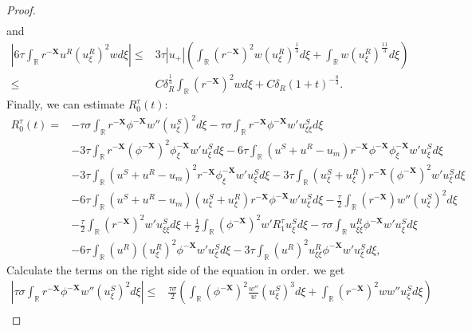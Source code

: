 \documentclass[10pt,reqno]{amsart}
\numberwithin{equation}{section}
\begin{document}
\begin{proof}
\begin{equation}
\begin{aligned}
			\end{aligned}
		\end{equation}
		and
		\begin{equation}\label{N14}
			\begin{aligned}
				\left|6\tau\int_{\mathbb{R}}r^{-\mathbf{X}}u^R(u_{\xi}^R)^2wd\xi\right|\leq&3\tau|u_+|\left(\int_{\mathbb{R}}(r^{-\mathbf{X}})^2w(u_{\xi}^R)^{\frac{1}{3}}d\xi+\int_{\mathbb{R}}w(u_{\xi}^R)^{\frac{11}{3}}d\xi\right)\\
				\leq&C\delta_R^{\frac{1}{3}}\int_{\mathbb{R}}(r^{-\mathbf{X}})^2wd\xi+C\delta_R(1+t)^{-\frac{8}{3}}.
			\end{aligned}
		\end{equation}
		Finally, we can estimate $R_0^{\tau}(t)$:
		\begin{equation*}
			\begin{aligned}
				R_{0}^{\tau}(t)=&- \tau\sigma\int_{\mathbb{R}}r^{-\mathbf{X}}\phi^{-\mathbf{X}}w''\left(u_{\xi}^{S}\right)^{2}d\xi-\tau\sigma\int_{\mathbb{R}}r^{-\mathbf{X}}\phi^{-\mathbf{X}}w'u^S_{\xi\xi}d\xi\\
				&-3\tau\int_{\mathbb{R}}r^{-\mathbf{X}}(\phi^{-\mathbf{X}})^{2}\phi_{\xi}^{-\mathbf{X}}w'u_{\xi}^{S}d\xi -6\tau\int_{\mathbb{R}}(u^{S}+u^{R}-u_{m})r^{-\mathbf{X}}\phi^{-\mathbf{X}}\phi_{\xi}^{-\mathbf{X}}w'u_{\xi}^{S}d\xi\\
				&-3\tau\int_{\mathbb{R}}(u^{S}+u^{R}-u_{m})^{2}r^{-\mathbf{X}}\phi_{\xi}^{-\mathbf{X}}w'u_{\xi}^{S}d\xi-3\tau\int_{\mathbb{R}}(u_{\xi}^{S}+u_{\xi}^{R})r^{-\mathbf{X}}(\phi^{-\mathbf{X}})^{2}w'u_{\xi}^{S}d\xi\\
				&-6\tau\int_{\mathbb{R}}(u^{S}+u^{R}-u_{m})(u_{\xi}^{S}+u_{\xi}^{R})r^{-\mathbf{X}}\phi^{-\mathbf{X}}w'u_{\xi}^{S}d\xi-\frac{\tau}{2}\int_{\mathbb{R}}(r^{-\mathbf{X}})w''(u_{\xi}^{S})^{2}d\xi\\
				&-\frac{\tau}{2}\int_{\mathbb{R}}(r^{-\mathbf{X}})^{2}w'u_{\xi\xi}^Sd\xi+\frac{1}{2}\int_{\mathbb{R}}(\phi^{-\mathbf{X}})^{2}w'R_{1}^{\tau}u_{\xi}^{S}d\xi-\tau\sigma\int_{\mathbb{R}}u_{\xi\xi}^R\phi^{-\mathbf{X}}w'u_{\xi}^Sd\xi\\
				&- 6\tau\int_{\mathbb{R}}(u^{R})(u_{\xi}^{R})^{2}\phi^{-\mathbf{X}}w'u_{\xi}^{S}d\xi-3\tau\int_{\mathbb{R}}(u^{R})^{2}u_{\xi\xi}^{R}\phi^{-\mathbf{X}}w'u_{\xi}^{S}d\xi,
			\end{aligned}
		\end{equation*}
		Calculate the terms on the right side of the equation in order. we get
		\begin{align*}
			\left|\tau\sigma\int_{\mathbb{R}}r^{-\mathbf{X}}\phi^{-\mathbf{X}}w''\left(u_{\xi}^{S}\right)^{2}d\xi\right|\leq& \frac{\tau\sigma}{2}\left(\int_{\mathbb{R}}(\phi^{-\mathbf{X}})^2\frac{w''}{w}(u^S_{\xi})^3d\xi+\int_{\mathbb{R}}(r^{-\mathbf{X}})^2ww''u^S_{\xi}d\xi\right)\\

\end{align*}
\end{proof}
\end{document}
